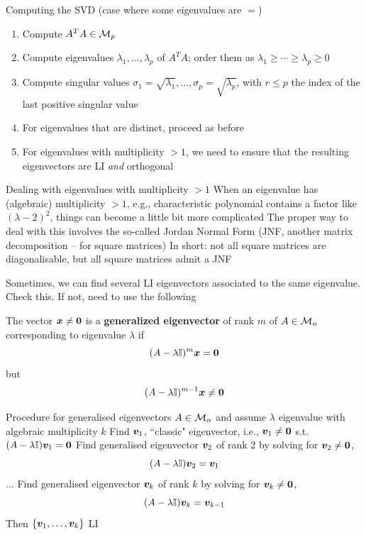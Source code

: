 \documentclass[aspectratio=169]{beamer}\usepackage[]{graphicx}\usepackage[]{xcolor}
\begin{document}
\begin{frame}{Computing the SVD (case where some eigenvalues are $=$)}
\begin{enumerate}
\item Compute $A^TA\in\mathcal{M}_p$
\item Compute eigenvalues $\lambda_1,\ldots,\lambda_p$ of $A^TA$; order them as $\lambda_1\geq\cdots\geq\lambda_p\geq 0$
\item Compute singular values $\sigma_1=\sqrt{\lambda_1},\ldots,\sigma_p=\sqrt{\lambda_p}$, with $r\leq p$ the index of the last positive singular value
\item For eigenvalues that are distinct, proceed as before
\item For eigenvalues with multiplicity $>1$, we need to ensure that the resulting eigenvectors are LI \emph{and} orthogonal
\end{enumerate}
\end{frame}

\begin{frame}{Dealing with eigenvalues with multiplicity $>1$}
When an eigenvalue has (algebraic) multiplicity $>1$, e.g., characteristic polynomial contains a factor like $(\lambda-2)^2$, things can become a little bit more complicated
\vfill
The proper way to deal with this involves the so-called Jordan Normal Form (JNF, another matrix decomposition -- for square matrices)
\vfill
In short: not all square matrices are diagonalisable, but all square matrices admit a JNF
\end{frame}


\begin{frame}
Sometimes, we can find several LI eigenvectors associated to the same eigenvalue. Check this. If not, need to use the following
\vfill
\begin{definition}
The vector $\bx\neq\b0$ is a \textbf{generalized eigenvector} of rank $m$ of $A\in\mathcal{M}_n$ corresponding to eigenvalue $\lambda$ if
\[
(A-\lambda\II)^{m}\bx = \b0
\]
but
\[
(A-\lambda\II)^{m-1}\bx\neq \b0
\]
\end{definition}
\end{frame}


\begin{frame}{Procedure for generalised eigenvectors}
$A\in\mathcal{M}_n$ and assume $\lambda$ eigenvalue with algebraic multiplicity $k$
\vfill
Find $\bm{v}_1$, ``classic" eigenvector, i.e., $\bv_1\neq\b0$ s.t. $(A-\lambda\II)\bv_1=\b0$
\vfill
Find generalised eigenvector $\bm{v}_2$ of rank 2 by solving for $\bv_2\neq\b0$,
\[
(A-\lambda\mathbb{I})\bm{v}_2 = \bm{v}_1
\]
$\ldots$
\vfill
Find generalised eigenvector $\bm{v}_k$ of rank $k$ by solving for $\bv_k\neq\b0$,
\[
(A-\lambda\mathbb{I})\bm{v}_k = \bm{v}_{k-1}
\]
\vfill
Then $\{\bm{v}_1,\ldots,\bm{v}_k\}$ LI
\end{frame}
\end{document}
